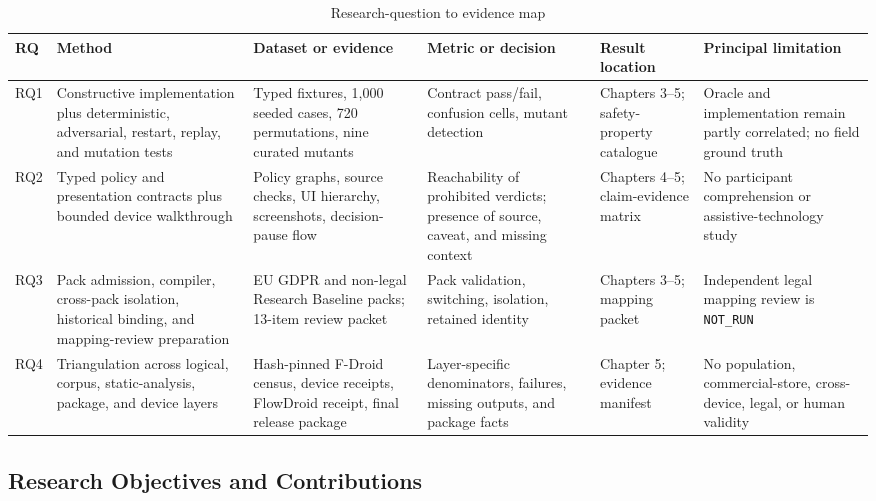\begin{table}[H]
\centering
\caption{Research-question to evidence map}
\label{tab:rq-evidence-map}
\scriptsize
\setlength{\tabcolsep}{3pt}
\begin{tabular}{>{\raggedright\arraybackslash}p{}>{\raggedright\arraybackslash}p{}>{\raggedright\arraybackslash}p{}>{\raggedright\arraybackslash}p{}>{\raggedright\arraybackslash}p{}>{\raggedright\arraybackslash}p{}}
\toprule
RQ & Method & Dataset or evidence & Metric or decision & Result location & Principal limitation \\
\midrule
RQ1 & Constructive implementation plus deterministic, adversarial, restart, replay, and mutation tests & Typed fixtures, 1,000 seeded cases, 720 permutations, nine curated mutants & Contract pass/fail, confusion cells, mutant detection & Chapters 3--5; safety-property catalogue & Oracle and implementation remain partly correlated; no field ground truth \\
RQ2 & Typed policy and presentation contracts plus bounded device walkthrough & Policy graphs, source checks, UI hierarchy, screenshots, decision-pause flow & Reachability of prohibited verdicts; presence of source, caveat, and missing context & Chapters 4--5; claim-evidence matrix & No participant comprehension or assistive-technology study \\
RQ3 & Pack admission, compiler, cross-pack isolation, historical binding, and mapping-review preparation & EU GDPR and non-legal Research Baseline packs; 13-item review packet & Pack validation, switching, isolation, retained identity & Chapters 3--5; mapping packet & Independent legal mapping review is \texttt{NOT\_RUN} \\
RQ4 & Triangulation across logical, corpus, static-analysis, package, and device layers & Hash-pinned F-Droid census, device receipts, FlowDroid receipt, final release package & Layer-specific denominators, failures, missing outputs, and package facts & Chapter 5; evidence manifest & No population, commercial-store, cross-device, legal, or human validity \\
\bottomrule
\end{tabular}
\end{table}

\subsection{Research Objectives and Contributions}

